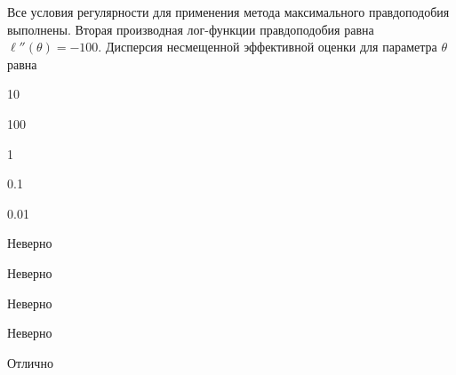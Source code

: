 
\begin{question}
Все условия регулярности для применения метода максимального
правдоподобия выполнены. Вторая производная лог-функции правдоподобия
равна \(\ell''(\theta)=-100\). Дисперсия несмещенной эффективной оценки
для параметра \(\theta\) равна
\begin{answerlist}
  \item 10
  \item 100
  \item 1
  \item 0.1
  \item 0.01
\end{answerlist}
\end{question}

\begin{solution}
\begin{answerlist}
  \item Неверно
  \item Неверно
  \item Неверно
  \item Неверно
  \item Отлично
\end{answerlist}
\end{solution}


